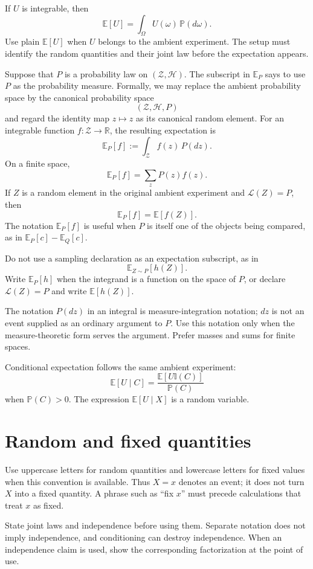 \documentclass[11pt]{article}
\newcommand{\E}{\mathbb E}
\newcommand{\I}{\mathbb I}
\renewcommand{\P}{\mathbb P}
\newcommand{\Law}{\mathcal L}
\newcommand{\R}{\mathbb R}
\begin{document}
If \(U\) is integrable, then
\[
 \E[U]=\int_\Omega U(\omega)\,\P(d\omega).
\]
Use plain \(\E[U]\) when \(U\) belongs to the ambient experiment. The setup
must identify the random quantities and their joint law before the expectation
appears.

Suppose that \(P\) is a probability law on \((\mathcal Z,\mathcal H)\). The
subscript in \(\E_P\) says to use \(P\) as the probability measure. Formally,
we may replace the ambient probability space by the canonical probability
space
\[
 (\mathcal Z,\mathcal H,P)
\]
and regard the identity map \(z\mapsto z\) as its canonical random element.
For an integrable function \(f:\mathcal Z\to\R\), the resulting expectation
is
\begin{equation}
 \E_P[f]:=\int_{\mathcal Z} f(z)\,P(dz).
 \label{eq:law-expectation}
\end{equation}
On a finite space,
\[
 \E_P[f]=\sum_z P(z)f(z).
\]
If \(Z\) is a random element in the original ambient experiment and
\(\Law(Z)=P\), then
\[
 \E_P[f]=\E[f(Z)].
\]
The notation \(\E_P[f]\) is useful when \(P\) is itself one of the objects
being compared, as in \(\E_P[c]-\E_Q[c]\).

Do not use a sampling declaration as an expectation subscript, as in
\[
 \E_{Z\sim P}[h(Z)]
 .
\]
Write \(\E_P[h]\) when the integrand is a function on the space of \(P\), or
declare \(\Law(Z)=P\) and write \(\E[h(Z)]\).

The notation \(P(dz)\) in an integral is measure-integration notation; \(dz\)
is not an event supplied as an ordinary argument to \(P\). Use this notation
only when the measure-theoretic form serves the argument. Prefer masses and
sums for finite spaces.

Conditional expectation follows the same ambient experiment:
\[
 \E[U\mid C]
 =\frac{\E[U\I(C)]}{\P(C)}
\]
when \(\P(C)>0\). The expression \(\E[U\mid X]\) is a random variable.

\section{Random and fixed quantities}

Use uppercase letters for random quantities and lowercase letters for fixed
values when this convention is available. Thus \(X=x\) denotes an event;
it does not turn \(X\) into a fixed quantity. A phrase such as ``fix \(x\)''
must precede calculations that treat \(x\) as fixed.

State joint laws and independence before using them. Separate notation does
not imply independence, and conditioning can destroy independence. When an
independence claim is used, show the corresponding factorization at the point
of use.
\end{document}
